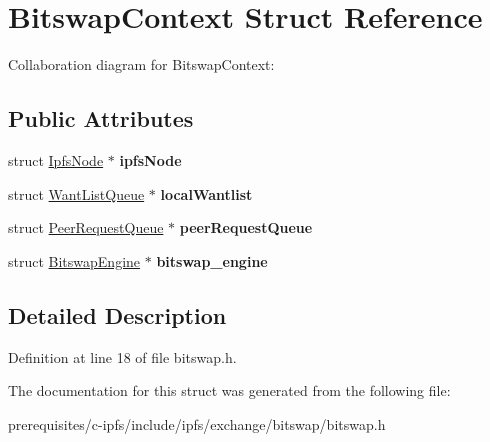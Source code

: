 \hypertarget{struct_bitswap_context}{}\section{Bitswap\+Context Struct Reference}
\label{struct_bitswap_context}


Collaboration diagram for Bitswap\+Context\+:
\subsection*{Public Attributes}
\begin{DoxyCompactItemize}
\item 
\mbox{\label{struct_bitswap_context_abe77d8ffb87d7e4b95176184e0817f1b}} 
struct \mbox{\hyperlink{struct_ipfs_node}{Ipfs\+Node}} $\ast$ {\bfseries ipfs\+Node}
\item 
\mbox{\label{struct_bitswap_context_aada46318ccfd4e45be8d8376dd0c57ca}} 
struct \mbox{\hyperlink{struct_want_list_queue}{Want\+List\+Queue}} $\ast$ {\bfseries local\+Wantlist}
\item 
\mbox{\label{struct_bitswap_context_a5bf85c86419d05fb249c11e74d2a4678}} 
struct \mbox{\hyperlink{struct_peer_request_queue}{Peer\+Request\+Queue}} $\ast$ {\bfseries peer\+Request\+Queue}
\item 
\mbox{\label{struct_bitswap_context_a140a9c12a15e3e2ce538aa521c0aa201}} 
struct \mbox{\hyperlink{struct_bitswap_engine}{Bitswap\+Engine}} $\ast$ {\bfseries bitswap\+\_\+engine}
\end{DoxyCompactItemize}


\subsection{Detailed Description}


Definition at line 18 of file bitswap.\+h.



The documentation for this struct was generated from the following file\+:\begin{DoxyCompactItemize}
\item 
prerequisites/c-\/ipfs/include/ipfs/exchange/bitswap/bitswap.\+h\end{DoxyCompactItemize}
